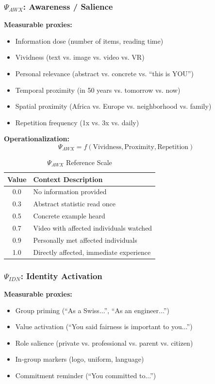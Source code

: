 \subsubsection{$\Psi_{AWX}$: Awareness / Salience}

\textbf{Measurable proxies:}
\begin{itemize}
\item Information dose (number of items, reading time)
\item Vividness (text vs. image vs. video vs. VR)
\item Personal relevance (abstract vs. concrete vs. ``this is YOU'')
\item Temporal proximity (in 50 years vs. tomorrow vs. now)
\item Spatial proximity (Africa vs. Europe vs. neighborhood vs. family)
\item Repetition frequency (1x vs. 3x vs. daily)
\end{itemize}

\textbf{Operationalization:}
\begin{equation}
\Psi_{AWX} = f(\text{Vividness}, \text{Proximity}, \text{Repetition})
\end{equation}

\begin{table}[htbp]
\centering
\caption{$\Psi_{AWX}$ Reference Scale}
\begin{tabular}{@{}cl@{}}
\toprule
\textbf{Value} & \textbf{Context Description} \\
\midrule
0.0 & No information provided \\
0.3 & Abstract statistic read once \\
0.5 & Concrete example heard \\
0.7 & Video with affected individuals watched \\
0.9 & Personally met affected individuals \\
1.0 & Directly affected, immediate experience \\
\bottomrule
\end{tabular}
\end{table}

\subsubsection{$\Psi_{IDN}$: Identity Activation}

\textbf{Measurable proxies:}
\begin{itemize}
\item Group priming (``As a Swiss...'', ``As an engineer...'')
\item Value activation (``You said fairness is important to you...'')
\item Role salience (private vs. professional vs. parent vs. citizen)
\item In-group markers (logo, uniform, language)
\item Commitment reminder (``You committed to...'')
\end{itemize}


